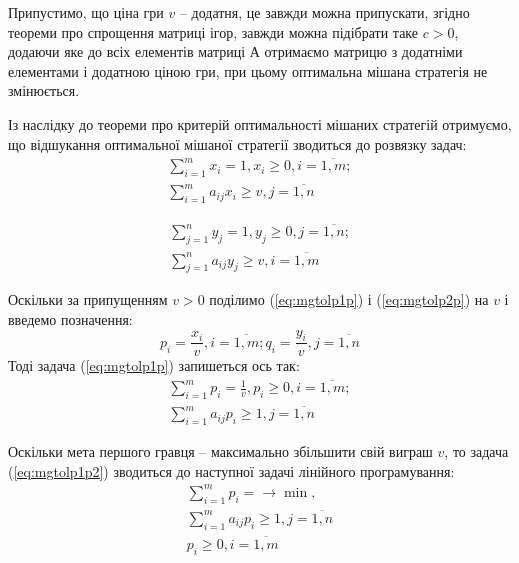 \documentclass[12pt,a4paper]{report}
\begin{document}
Припустимо, що ціна гри $v$ – додатня, це завжди можна припускати, згідно теореми про спрощення матриці ігор, завжди можна підібрати таке $c>0$, додаючи яке до всіх елементів матриці $А$ отримаємо матрицю з додатніми елементами і додатною ціною гри, при цьому оптимальна мішана стратегія не змінюється. 

Із наслідку до теореми про критерій оптимальності мішаних стратегій отримуємо, що відшукання оптимальної мішаної стратегії зводиться до розвязку задач:
\begin{equation}
\begin{array}{l}
\displaystyle \sum_{i=1}^m x_i = 1, x_i \geq 0, i=\overline{1,m};\\
\displaystyle \sum_{i=1}^m a_{ij} x_i \geq v,  j=\overline{1,n}
\end{array}
\label{eq:mgtolp1p}
\end{equation}

\begin{equation}
\begin{array}{l}
\displaystyle \sum_{j=1}^n y_j = 1, y_j \geq 0, j=\overline{1,n};\\
\displaystyle \sum_{j=1}^n a_{ij} y_j \geq v,  i=\overline{1,m}
\end{array}
\label{eq:mgtolp2p}
\end{equation}

Оскільки за припущенням $v>0$  поділимо (\ref{eq:mgtolp1p}) і (\ref{eq:mgtolp2p}) на $v$ і введемо позначення:
\[ \displaystyle p_i=\frac{x_i}{v},  i=\overline{1,m}; q_i=\frac{y_i}{v},  j=\overline{1,n} \]
Тоді задача (\ref{eq:mgtolp1p}) запишеться ось так:
\begin{equation}
\begin{array}{l}
\displaystyle \sum_{i=1}^m p_i = \frac{1}{v}, p_i \geq 0, i=\overline{1,m};\\
\displaystyle \sum_{i=1}^m a_{ij} p_i \geq 1,  j=\overline{1,n}
\end{array}
\label{eq:mgtolp1p2}
\end{equation}

Оскільки мета першого гравця – максимально збільшити свій виграш $v$, то задача (\ref{eq:mgtolp1p2}) зводиться до наступної задачі лінійного програмування:
\begin{equation}
\begin{array}{l}
\displaystyle \sum_{i=1}^m p_i = \to \min,\\
\displaystyle \sum_{i=1}^m a_{ij} p_i \geq 1,  j=\overline{1,n}\\
p_i \geq 0, i=\overline{1,m}
\end{array}
\label{eq:mgtolp1p3}
\end{equation}
\end{document}
